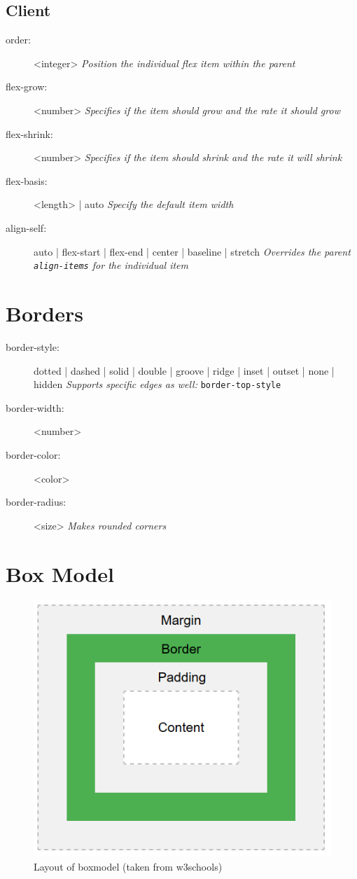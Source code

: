 \documentclass[12pt, a4paper]{article}
\begin{document}
\begin{multicols}{2}
		\subsection{Client}
		\begin{description}
			\item[order:] <integer>
			\subitem\textit{Position the individual flex item within the parent}
			\item[flex-grow:] <number>
			\subitem\textit{Specifies if the item should grow and the rate it should grow}
			\item[flex-shrink:] <number>
			\subitem\textit{Specifies if the item should shrink and the rate it will shrink}
			\item[flex-basis:] <length> | auto
			\subitem\textit{Specify the default item width}
			\item[align-self:] auto | flex-start | flex-end | center | baseline | stretch
			\subitem\textit{Overrides the parent \texttt{align-items} for the individual item}
		\end{description}
		
		\section{Borders}
		\begin{description}
			\item[border-style:] dotted | dashed | solid | double | groove | ridge | inset | outset | none | hidden
			\subitem\textit{Supports specific edges as well: }\texttt{border-top-style}
			\item[border-width:] <number>
			\item[border-color:] <color>
			\item[border-radius:] <size>
			\subitem\textit{Makes rounded corners}
		\end{description}
		
		\section{Box Model}
		\begin{figure}[H]
			\centering
			\includegraphics[width=0.9\linewidth]{box}
			\caption{Layout of boxmodel (taken from w3schools)}
		\end{figure}

\end{multicols}
\end{document}
